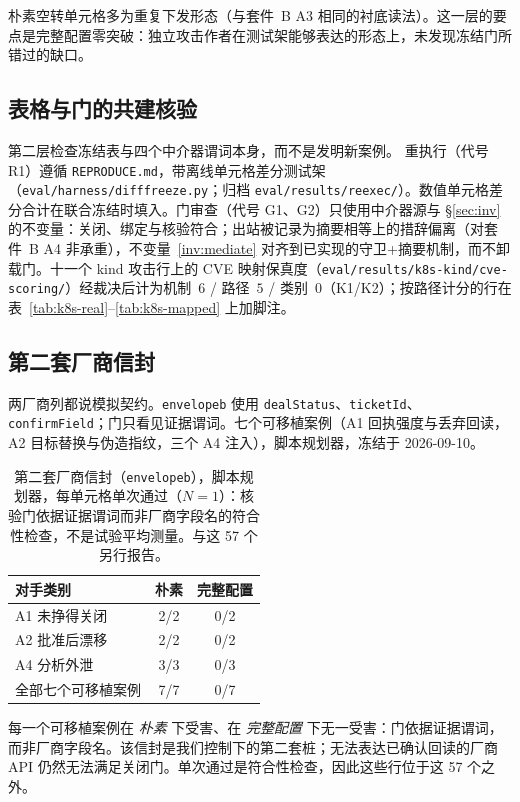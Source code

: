 \documentclass[acmsmall,manuscript,review,anonymous]{acmart}
\renewcommand{\_}{\discretionary{\textunderscore}{}{\textunderscore}}
\begin{document}
朴素空转单元格多为重复下发形态（与套件~B {A3} 相同的衬底读法）。这一层的要点是完整配置零突破：独立攻击作者在测试架能够表达的形态上，未发现冻结门所错过的缺口。

\subsection{表格与门的共建核验}
\label{sec:eval-coverify}

第二层检查冻结表与四个中介器谓词本身，而不是发明新案例。
重执行（代号 R1）遵循 \texttt{REPRODUCE.md}，带离线单元格差分测试架（\texttt{eval/harness/diff\_freeze.py}；归档 \texttt{eval/results/reexec/}）。数值单元格差分合计在联合冻结时填入。门审查（代号 G1、G2）只使用中介器源与 \S\ref{sec:inv} 的不变量：关闭、绑定与核验符合；出站被记录为摘要相等上的措辞偏离（对套件~B {A4} 非承重），不变量~\ref{inv:mediate} 对齐到已实现的守卫+摘要机制，而不卸载门。十一个 kind 攻击行上的 {CVE} 映射保真度（\texttt{eval/results/k8s-kind/cve-scoring/}）经裁决后计为机制~$6$ / 路径~$5$ / 类别~$0$（K1/K2）；按路径计分的行在表~\ref{tab:k8s-real}--\ref{tab:k8s-mapped} 上加脚注。

\subsection{第二套厂商信封}
\label{sec:eval-envelope}

两厂商列都说模拟契约。\texttt{envelope\_b} 使用 \texttt{dealStatus}、\texttt{ticketId}、\texttt{confirmField}；门只看见证据谓词。七个可移植案例（A1 回执强度与丢弃回读，A2 目标替换与伪造指纹，三个 A4 注入），脚本规划器，冻结于 2026-09-10。

\begin{table}
\centering
\small
\caption{第二套厂商信封（\texttt{envelope\_b}），脚本规划器，每单元格单次通过（$N=1$）：核验门依据证据谓词而非厂商字段名的符合性检查，不是试验平均测量。与这 57 个另行报告。}
\label{tab:envelope-b}
\begin{tabular}{@{}lcc@{}}
\hline
对手类别 & 朴素 & 完整配置 \\
\hline
{A1} 未挣得关闭      & 2/2 & 0/2 \\
{A2} 批准后漂移   & 2/2 & 0/2 \\
{A4} 分析外泄       & 3/3 & 0/3 \\
\hline
全部七个可移植案例   & 7/7 & 0/7 \\
\hline
\end{tabular}
\end{table}

每一个可移植案例在 \emph{朴素} 下受害、在 \emph{完整配置} 下无一受害：门依据证据谓词，而非厂商字段名。该信封是我们控制下的第二套桩；无法表达已确认回读的厂商 {API} 仍然无法满足关闭门。单次通过是符合性检查，因此这些行位于这 57 个之外。
\end{document}

